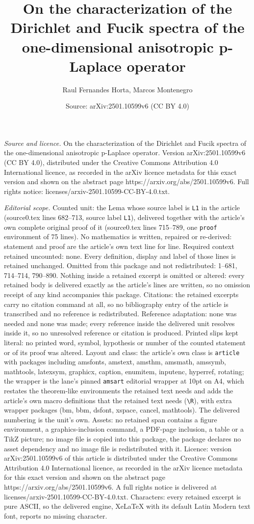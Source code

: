 \documentclass[10pt,a4paper]{amsart}
\title[On the characterization of the Dirichlet and Fucik spectra o]{On the characterization of the Dirichlet and Fucik spectra of the one-dimensional anisotropic p-Laplace operator}
\author{Raul Fernandes Horta, Marcos Montenegro}
\date{Source: arXiv:2501.10599v6 (CC BY 4.0)}
\begin{document}
\maketitle

\noindent\emph{Source and licence.} On the characterization of the Dirichlet and Fucik spectra of the one-dimensional anisotropic p-Laplace operator. Version arXiv:2501.10599v6 (CC BY 4.0), distributed under the Creative Commons Attribution 4.0 International licence, as recorded in the arXiv licence metadata for this exact version and shown on the abstract page https://arxiv.org/abs/2501.10599v6. Full rights notice: licenses/arxiv-2501.10599-CC-BY-4.0.txt.\par\smallskip

\noindent\textit{Editorial scope.} Counted unit: the Lema whose source label is \texttt{L1} in the article (source0.tex lines 682--713, source label \texttt{L1}), delivered together with the article's own complete original proof of it (source0.tex lines 715--789, one \texttt{proof} environment of 75 lines). No mathematics is written, repaired or re-derived: statement and proof are the article's own text line for line. Required context retained uncounted: none. Every definition, display and label of those lines is retained unchanged. Omitted from this package and not redistributed: 1--681, 714--714, 790--890. Nothing inside a retained excerpt is omitted or altered: every retained body is delivered exactly as the article's lines are written, so no omission receipt of any kind accompanies this package. Citations: the retained excerpts carry no citation command at all, so no bibliography entry of the article is transcribed and no reference is redistributed. Reference adaptation: none was needed and none was made; every reference inside the delivered unit resolves inside it, so no unresolved reference or citation is produced. Printed slips kept literal: no printed word, symbol, hypothesis or number of the counted statement or of its proof was altered. Layout and class: the article's own class is \texttt{article} with packages including amsfonts, amstext, amsthm, amsmath, amssymb, mathtools, latexsym, graphicx, caption, enumitem, inputenc, hyperref, rotating; the wrapper is the lane's pinned \texttt{amsart} editorial wrapper at 10pt on A4, which restates the theorem-like environments the retained text needs and adds the article's own macro definitions that the retained text needs (\texttt{\textbackslash R}), with extra wrapper packages (bm, bbm, dsfont, xspace, cancel, mathtools). The delivered numbering is the unit's own. Assets: no retained span contains a figure environment, a graphics-inclusion command, a PDF-page inclusion, a table or a TikZ picture; no image file is copied into this package, the package declares no asset dependency and no image file is redistributed with it. Licence: version arXiv:2501.10599v6 of this article is distributed under the Creative Commons Attribution 4.0 International licence, as recorded in the arXiv licence metadata for this exact version and shown on the abstract page https://arxiv.org/abs/2501.10599v6. A full rights notice is delivered at licenses/arxiv-2501.10599-CC-BY-4.0.txt. Characters: every retained excerpt is pure ASCII, so the delivered engine, XeLaTeX with its default Latin Modern text font, reports no missing character.
\end{document}
